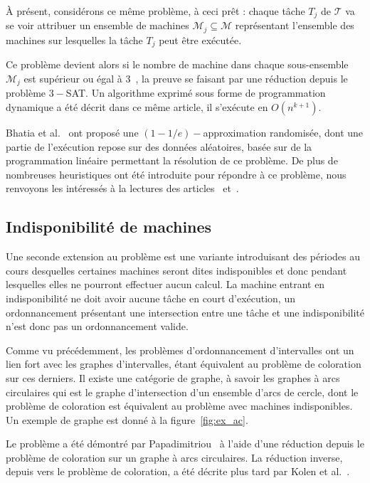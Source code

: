 \documentclass[a4paper,11pt]{report}
\begin{document}
À présent, considérons ce même problème, à ceci prêt : chaque tâche $T_j$ de $\mathcal{T}$ va se voir
attribuer un ensemble de machines $\mathcal{M}_j \subseteq \mathcal{M}$ représentant l'ensemble des
machines sur lesquelles la tâche $T_j$ peut être exécutée.

Ce problème devient alors \npc si le nombre de machine dans chaque sous-ensemble $\mathcal{M}_j$ est
supérieur ou égal à $3$~\cite{arkin_scheduling_1987}, la preuve se faisant par une réduction depuis
le problème \textsc{$3-$SAT}. Un algorithme exprimé sous forme de programmation dynamique a été
décrit dans ce même article, il s'exécute en $O(n^{k+1})$.

Bhatia et al.~\cite{bhatia2003algorithmic} ont proposé une $(1 - 1/e)-$approximation
randomisée, dont une partie de l'exécution repose sur des données aléatoires, basée sur de la
programmation linéaire permettant la résolution de ce problème. De plus de nombreuses heuristiques
ont été introduite pour répondre à ce problème, nous renvoyons les intéressés à la lectures des
articles~\cite{kroon1995exact} et~\cite{gabrel1995scheduling}.

\subsection{Indisponibilité de machines}

Une seconde extension au problème \bisched{} est une variante introduisant des périodes au cours
desquelles certaines machines seront dites indisponibles et donc pendant lesquelles elles ne
pourront effectuer aucun calcul. La machine entrant en indisponibilité ne doit avoir aucune tâche en
court d'exécution, un ordonnancement présentant une intersection entre une tâche et une
indisponibilité n'est donc pas un ordonnancement valide.

Comme vu précédemment, les problèmes d'ordonnancement d'intervalles ont un lien fort avec les
graphes d'intervalles, \bisched{} étant équivalent au problème de coloration sur ces derniers. Il
existe une catégorie de graphe, à savoir les graphes à arcs circulaires qui est le
graphe d'intersection d'un ensemble d'arcs de cercle, dont le problème de coloration est équivalent
au problème avec machines indisponibles. Un exemple de graphe est donné à la figure~\ref{fig:ex_ac}.

Le problème \isma{} a été démontré \npc par
Papadimitriou~\cite{papadimitriou1982private} à l'aide d'une réduction depuis le problème de
coloration sur un graphe à arcs circulaires. La réduction inverse, depuis \isma{} vers le problème de
coloration, a été décrite plus tard par Kolen et al.~\cite{kolen2007interval}. 
\end{document}
